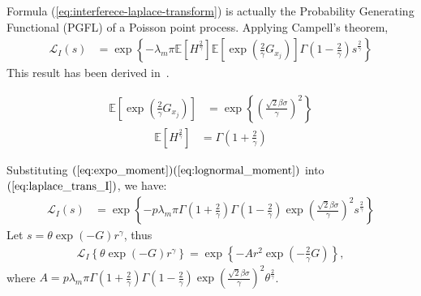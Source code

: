 Formula (\ref{eq:interferece-laplace-transform}) is actually the Probability Generating Functional (PGFL) of a Poisson point process.
Applying Campell's theorem, 
\begin{align}
\label{eq:laplace_trans_I}
\mathcal{L}_{I}\left( s \right) &=\exp\left\lbrace -\lambda_m \pi \mathbb{E}\left[ H^{\frac{2}{\gamma}}\right]\mathbb{E}\left[ \exp(\frac{2}{\gamma}G_{x_j})\right] \Gamma(1-\frac{2}{\gamma})s^{\frac{2}{\gamma}}  \right\rbrace 
\end{align}
This result has been derived in~\cite[eq.3.20]{haenggi2009interference}.

\begin{align}
\label{eq:lognormal_moment}
\mathbb{E}\left[ \exp(\frac{2}{\gamma}G_{x_j})\right] &= \exp \left\lbrace \left( \frac{\sqrt{2}\beta\sigma}{\gamma}\right) ^2\right\rbrace 
\end{align}
\begin{align}
\label{eq:expo_moment}
\mathbb{E}\left[ H^{\frac{2}{\gamma}} \right] &= \Gamma(1+\frac{2}{\gamma}) 
\end{align}

Substituting $(\ref{eq:expo_moment})(\ref{eq:lognormal_moment})$ into $(\ref{eq:laplace_trans_I})$, we have:
\begin{align}
\mathcal{L}_{I}\left( s \right) &= \exp\left\lbrace -p\lambda_m \pi \Gamma(1+\frac{2}{\gamma}) \Gamma(1-\frac{2}{\gamma}) \exp \left( \frac{\sqrt{2}\beta\sigma}{\gamma}\right) ^2 s^{\frac{2}{\gamma}}  \right\rbrace
\end{align}
Let $s=\theta \exp(-G) r^{\gamma}$, thus
\begin{align}
	\mathcal{L}_{I}\left\lbrace \theta \exp(-G) r^{\gamma}\right\rbrace = \exp\left\lbrace -A r^2\exp(-\frac{2}{\gamma}G)\right\rbrace ,
\end{align}
where $A=p\lambda_m\pi \Gamma(1+\frac{2}{\gamma}) \Gamma(1-\frac{2}{\gamma}) \exp \left( \frac{\sqrt{2}\beta\sigma}{\gamma}\right) ^2 \theta^{\frac{2}{\gamma}}$.


